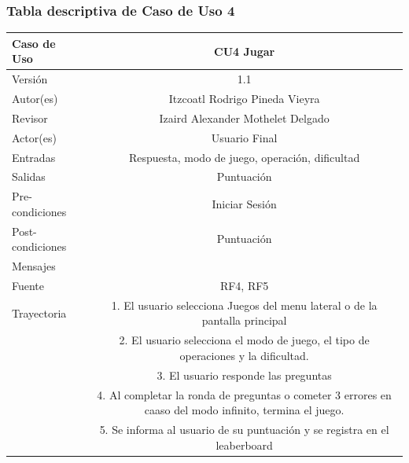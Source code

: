 \documentclass{article}
\begin{document}
\subsubsection{Tabla descriptiva de Caso de Uso 4}
\begin{tabular}{|M{5cm}|c|}
\hline
Caso de Uso & CU4 Jugar\\ \hline
Versión & 1.1\\ \hline
Autor(es) & Itzcoatl Rodrigo Pineda Vieyra\\ \hline
Revisor & Izaird Alexander Mothelet Delgado \\ \hline
Actor(es) & Usuario Final \\ \hline
Entradas &  Respuesta, modo de juego, operación, dificultad \\ \hline
Salidas & Puntuación \\ \hline
Pre-condiciones & Iniciar Sesión \\ \hline
Post-condiciones & Puntuación\\ \hline
Mensajes & \\
Fuente & RF4, RF5 \\ \hline	
	Trayectoria
		& 1.	El usuario selecciona Juegos del menu lateral o de la pantalla principal\\
		& 2. El usuario selecciona el modo de juego, el tipo de operaciones y la dificultad.\\
		& 3.    El usuario responde  las preguntas \\
		& 4.	Al completar la ronda de preguntas o cometer 3 errores en caaso del modo infinito, termina el juego.\\ 
		& 5. 	Se informa al usuario de su puntuación y se registra en el leaberboard\\ \hline
\end{tabular}
\end{document}

